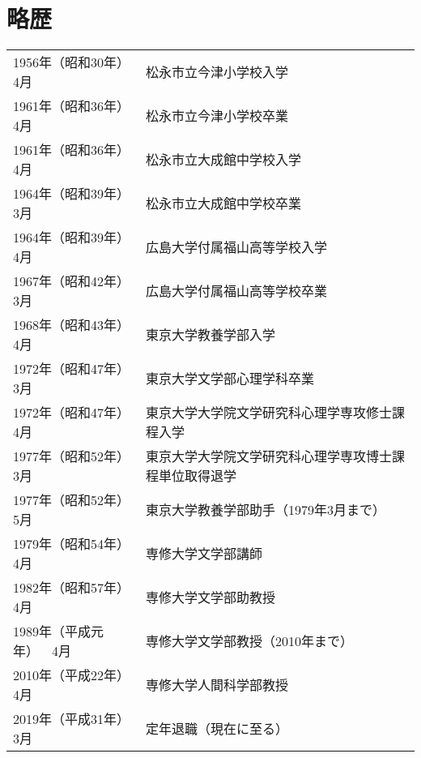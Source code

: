\documentclass[a5j]{jsarticle}
\begin{document}
\section*{略歴}
\vspace*{-0.5cm}
\begin{table}[htbp]
 \begin{tabular}{ll}
1956年（昭和30年）4月 & 松永市立今津小学校入学\\
1961年（昭和36年）4月 & 松永市立今津小学校卒業\\
1961年（昭和36年）4月 & 松永市立大成館中学校入学\\
1964年（昭和39年）3月 & 松永市立大成館中学校卒業\\
1964年（昭和39年）4月 & 広島大学付属福山高等学校入学\\
1967年（昭和42年）3月 & 広島大学付属福山高等学校卒業\\
1968年（昭和43年）4月 & 東京大学教養学部入学\\
1972年（昭和47年）3月 & 東京大学文学部心理学科卒業\\
1972年（昭和47年）4月 & 東京大学大学院文学研究科心理学専攻修士課程入学\\
1977年（昭和52年）3月 & 東京大学大学院文学研究科心理学専攻博士課程単位取得退学\\
1977年（昭和52年）5月 & 東京大学教養学部助手（1979年3月まで）\\
1979年（昭和54年）4月 & 専修大学文学部講師\\
1982年（昭和57年）4月 & 専修大学文学部助教授\\
1989年（平成元年）~~4月 & 専修大学文学部教授（2010年まで）\\
2010年（平成22年）4月 & 専修大学人間科学部教授\\
2019年（平成31年）3月 & 定年退職（現在に至る）
 \end{tabular}
\end{table}
\end{document}
